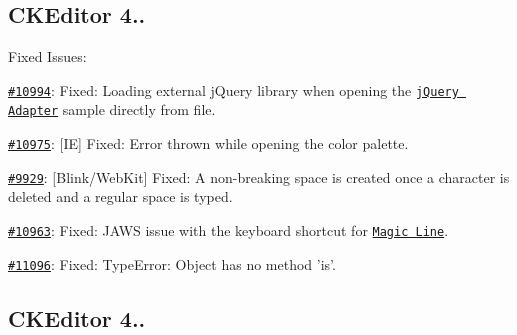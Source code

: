 \subsection*{C\-K\-Editor 4..}

Fixed Issues\-:
\begin{DoxyItemize}
\item \href{http://dev.ckeditor.com/ticket/10994}{\tt \#10994}\-: Fixed\-: Loading external j\-Query library when opening the \href{http://docs.ckeditor.com/#!/guide/dev_jquery}{\tt j\-Query Adapter} sample directly from file.
\item \href{http://dev.ckeditor.com/ticket/10975}{\tt \#10975}\-: \mbox{[}I\-E\mbox{]} Fixed\-: Error thrown while opening the color palette.
\item \href{http://dev.ckeditor.com/ticket/9929}{\tt \#9929}\-: \mbox{[}Blink/\-Web\-Kit\mbox{]} Fixed\-: A non-\/breaking space is created once a character is deleted and a regular space is typed.
\item \href{http://dev.ckeditor.com/ticket/10963}{\tt \#10963}\-: Fixed\-: J\-A\-W\-S issue with the keyboard shortcut for \href{http://ckeditor.com/addon/magicline}{\tt Magic Line}.
\item \href{http://dev.ckeditor.com/ticket/11096}{\tt \#11096}\-: Fixed\-: Type\-Error\-: Object has no method 'is'.
\end{DoxyItemize}

\subsection*{C\-K\-Editor 4..}

